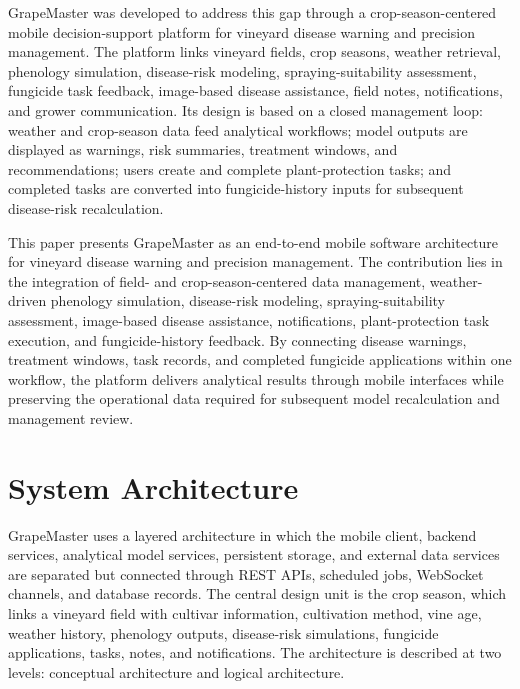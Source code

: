 \documentclass[11pt,a4paper]{article}
\begin{document}
GrapeMaster was developed to address this gap through a crop-season-centered mobile decision-support platform for vineyard disease warning and precision management. The platform links vineyard fields, crop seasons, weather retrieval, phenology simulation, disease-risk modeling, spraying-suitability assessment, fungicide task feedback, image-based disease assistance, field notes, notifications, and grower communication. Its design is based on a closed management loop: weather and crop-season data feed analytical workflows; model outputs are displayed as warnings, risk summaries, treatment windows, and recommendations; users create and complete plant-protection tasks; and completed tasks are converted into fungicide-history inputs for subsequent disease-risk recalculation.

This paper presents GrapeMaster as an end-to-end mobile software architecture for vineyard disease warning and precision management. The contribution lies in the integration of field- and crop-season-centered data management, weather-driven phenology simulation, disease-risk modeling, spraying-suitability assessment, image-based disease assistance, notifications, plant-protection task execution, and fungicide-history feedback. By connecting disease warnings, treatment windows, task records, and completed fungicide applications within one workflow, the platform delivers analytical results through mobile interfaces while preserving the operational data required for subsequent model recalculation and management review.

\section{System Architecture}

GrapeMaster uses a layered architecture in which the mobile client, backend services, analytical model services, persistent storage, and external data services are separated but connected through REST APIs, scheduled jobs, WebSocket channels, and database records. The central design unit is the crop season, which links a vineyard field with cultivar information, cultivation method, vine age, weather history, phenology outputs, disease-risk simulations, fungicide applications, tasks, notes, and notifications. The architecture is described at two levels: conceptual architecture and logical architecture.
\end{document}
